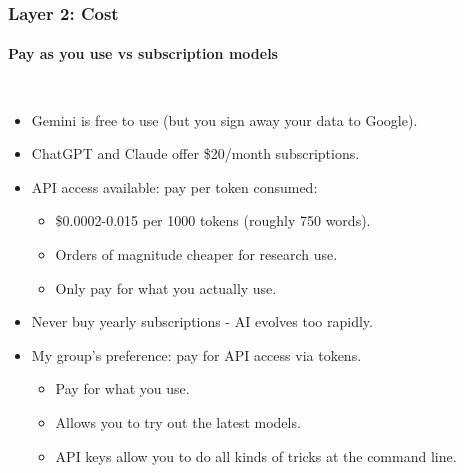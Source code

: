 \documentclass[aspectratio=169]{beamer}
\begin{document}
\begin{frame}
    \frametitle{Layer 2: Cost}
    \framesubtitle{Pay as you use vs subscription models}
    
    \begin{columns}
        \begin{itemize}
            \item Gemini is free to use (but you sign away your data to Google).
            \item ChatGPT and Claude offer \$20/month subscriptions.
            \item API access available: pay per token consumed:
                \begin{itemize}
                    \item \$0.0002-0.015 per 1000 tokens (roughly 750 words).
                    \item Orders of magnitude cheaper for research use.
                    \item Only pay for what you actually use.
                \end{itemize}
            \item Never buy yearly subscriptions - AI evolves too rapidly.
            \item My group's preference: pay for API access via tokens.
                \begin{itemize}
                    \item Pay for what you use.
                    \item Allows you to try out the latest models.
                    \item API keys allow you to do all kinds of tricks at the command line.
                \end{itemize}
        \end{itemize}
        

\end{columns}
\end{frame}
\end{document}
